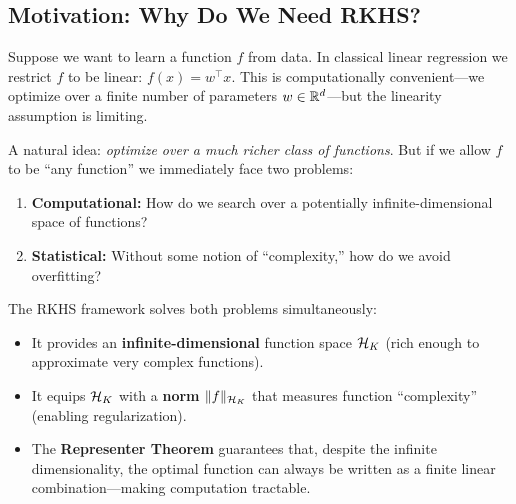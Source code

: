 \begin{notechapter}
\section{Motivation: Why Do We Need RKHS?}
\label{rkhs:sec:motivation}

Suppose we want to learn a function $f$ from data. In classical linear
regression we restrict $f$ to be linear: $f(x) = w^\top x$. This is
computationally convenient---we optimize over a finite number of
parameters $w \in \mathbb{R}^d$---but the linearity assumption is limiting.

A natural idea: \emph{optimize over a much richer class of functions}.
But if we allow $f$ to be ``any function'' we immediately face two
problems:

\begin{enumerate}[label=\textbf{(\arabic*)}]
  \item \textbf{Computational:} How do we search over a potentially
  infinite-dimensional space of functions?
  \item \textbf{Statistical:} Without some notion of ``complexity,'' how
  do we avoid overfitting?
\end{enumerate}

The RKHS framework solves both problems simultaneously:
\begin{itemize}
  \item It provides an \textbf{infinite-dimensional} function space
  $\mathcal{H}_K$ (rich enough to approximate very complex functions).
  \item It equips $\mathcal{H}_K$ with a \textbf{norm} $\| f \|_{\mathcal{H}_K}$ that
  measures function ``complexity'' (enabling regularization).
  \item The \textbf{Representer Theorem} guarantees that, despite the
  infinite dimensionality, the optimal function can always be written as
  a finite linear combination---making computation tractable.
\end{itemize}


\end{notechapter}

